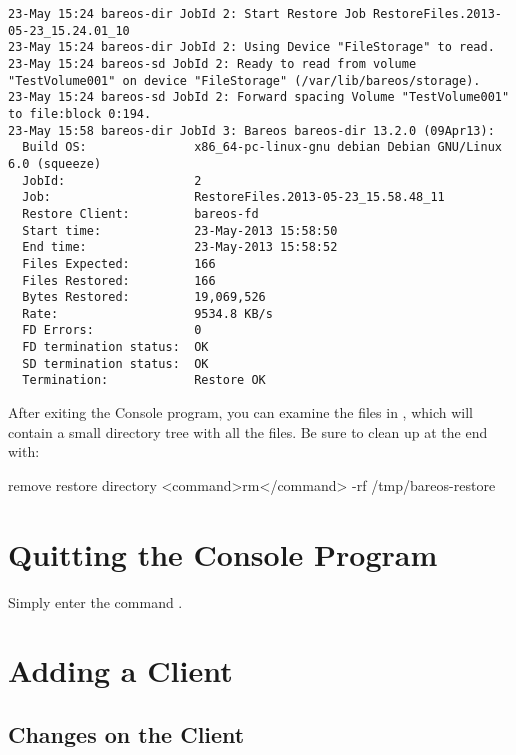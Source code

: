 \footnotesize
\begin{verbatim}
23-May 15:24 bareos-dir JobId 2: Start Restore Job RestoreFiles.2013-05-23_15.24.01_10
23-May 15:24 bareos-dir JobId 2: Using Device "FileStorage" to read.
23-May 15:24 bareos-sd JobId 2: Ready to read from volume "TestVolume001" on device "FileStorage" (/var/lib/bareos/storage).
23-May 15:24 bareos-sd JobId 2: Forward spacing Volume "TestVolume001" to file:block 0:194.
23-May 15:58 bareos-dir JobId 3: Bareos bareos-dir 13.2.0 (09Apr13):
  Build OS:               x86_64-pc-linux-gnu debian Debian GNU/Linux 6.0 (squeeze)
  JobId:                  2
  Job:                    RestoreFiles.2013-05-23_15.58.48_11
  Restore Client:         bareos-fd
  Start time:             23-May-2013 15:58:50
  End time:               23-May-2013 15:58:52
  Files Expected:         166
  Files Restored:         166
  Bytes Restored:         19,069,526
  Rate:                   9534.8 KB/s
  FD Errors:              0
  FD termination status:  OK
  SD termination status:  OK
  Termination:            Restore OK
\end{verbatim}
\normalsize

After exiting the Console program, you can examine the files in ,
which will contain a small directory tree with all the
files. Be sure to clean up at the end with:

\begin{commands}{remove restore directory}
<command>rm</command> -rf /tmp/bareos-restore
\end{commands}

\section{Quitting the Console Program}

Simply enter the command .

\section{Adding a Client}
\label{SecondClient}
\label{sec:AddAClient}

\subsection*{Changes on the Client}

